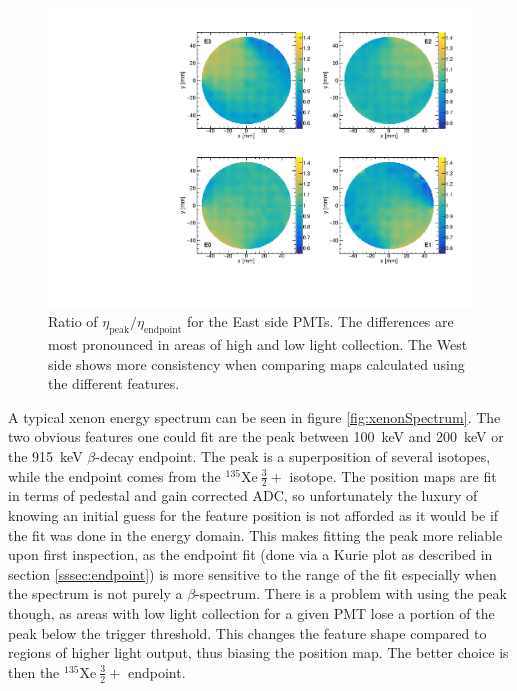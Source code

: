 \begin{figure}[h] 
\centering
\includegraphics[scale=.55]{4-UCNACalibrations/posmapComp_4_5mm_endpoint_vs_peak.pdf}
\caption{Ratio of $\eta_{\mathrm{peak}} / \eta_{\mathrm{endpoint}}$ for the East side PMTs. The differences
  are most pronounced in areas of high and low light collection. The West side shows more
  consistency when comparing maps calculated using the different features.}
\label{fig:posmapCompare}
\end{figure}

A typical xenon energy spectrum can be seen in figure \ref{fig:xenonSpectrum}. The two obvious features one could
fit are the peak between 100~keV and 200~keV or the 915~keV $\beta$-decay endpoint. The peak is a
superposition of several isotopes, while the endpoint comes from the
$^{135}\mathrm{Xe~}\frac{3}{2}+$ isotope. The position maps are fit in terms of pedestal and gain corrected ADC,
so unfortunately the luxury of knowing an initial guess for the feature position is not afforded as it would
be if the fit was done in the energy domain. This makes
fitting the peak more reliable upon first inspection, as the endpoint fit (done via a Kurie plot as described
in section \ref{sssec:endpoint}) is more sensitive to the range of the fit especially when the spectrum is not
purely a $\beta$-spectrum. There is a problem with using the peak though, as areas with low light collection
for a given PMT lose a portion of the peak below the trigger threshold. This changes the feature shape
compared to regions of higher light output, thus biasing the position map. The better choice is then the
$^{135}\mathrm{Xe~}\frac{3}{2}+$ endpoint. 


